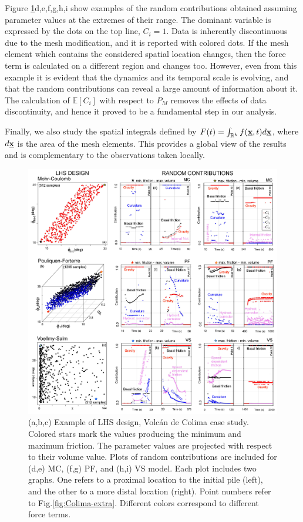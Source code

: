 \documentclass{article}
\begin{document}
Figure \ref{fig:Colima-CC1}d,e,f,g,h,i show examples of the random contributions obtained assuming parameter values at the extremes of their range. The dominant variable is expressed by the dots on the top line, $C_i=1$. Data is inherently discontinuous due to the mesh modification, and it is reported with colored dots. If the mesh element which contains the considered spatial location changes, then the force term is calculated on a different region and changes too. However, even from this example it is evident that the dynamics and its temporal scale is evolving, and that the random contributions can reveal a large amount of information about it. The calculation of $\mathbb E[C_i]$ with respect to $P_M$ removes the effects of data discontinuity, and hence it proved to be a fundamental step in our analysis.

Finally, we also study the spatial integrals defined by $F(t)=\int_{\mathbb R^k}f(\underline{\textbf x},t) d\underline{\textbf x}$, where $d\underline{\textbf x}$ is the area of the mesh elements. This provides a global view of the results and is complementary to the observations taken locally.

\begin{figure}[H]
         \centering
        \includegraphics[width=1\textwidth]{BAF_VolcanDeColima/SensitivityFigure_ok.jpg}
        \caption{(a,b,c) Example of LHS design, Volc\'an de Colima case study. Colored stars mark the values producing the minimum and maximum friction. The parameter values are projected with respect to their volume value. Plots of random contributions are included for (d,e) MC, (f,g) PF, and (h,i) VS model. Each plot includes two graphs. One refers to a proximal location to the initial pile (left), and the other to a more distal location (right). Point numbers refer to Fig.\ref{fig:Colima-extra}. Different colors correspond to different force terms.}
        \label{fig:Colima-CC1}
\end{figure}
\newpage
\end{document}
